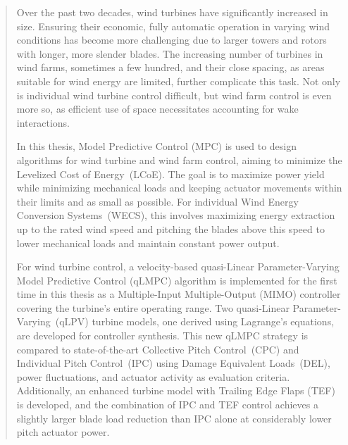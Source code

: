 \documentclass[12pt,a4paper,twoside,openright]{report}
\begin{document}
    \cleardoublepage
    \begin{abstract}
        

        
          Over the past two decades, wind turbines have significantly increased in size. Ensuring their economic, fully automatic operation in varying wind conditions has become more challenging due to larger towers and rotors with longer, more slender blades. The increasing number of turbines in wind farms, sometimes a few hundred, and their close spacing, as areas suitable for wind energy are limited, further complicate this task. Not only is individual wind turbine control difficult, but wind farm control is even more so, as efficient use of space necessitates accounting for wake interactions.
          
        In this thesis, Model Predictive Control (MPC) is used to design algorithms for wind turbine and wind farm control, aiming to minimize the Levelized Cost of Energy~(LCoE). The goal is to maximize power yield while minimizing mechanical loads and keeping actuator movements within their limits and as small as possible. For individual Wind Energy Conversion Systems~(WECS), this involves maximizing energy extraction up to the rated wind speed and pitching the blades above this speed to lower mechanical loads and maintain constant power output.
           
    For wind turbine control, a velocity-based quasi-Linear Parameter-Varying Model Predictive Control (qLMPC) algorithm is implemented for the first time in this thesis as a Multiple-Input Multiple-Output (MIMO) controller covering the turbine's entire operating range. Two quasi-Linear Parameter-Varying~(qLPV) turbine models, one derived using Lagrange's equations, are developed for controller synthesis. This new qLMPC strategy is compared to state-of-the-art Collective Pitch Control~(CPC) and Individual Pitch Control~(IPC) using Damage Equivalent Loads~(DEL), power fluctuations, and actuator activity as evaluation criteria. Additionally, an enhanced turbine model with Trailing Edge Flaps (TEF) is developed, and the combination of IPC and TEF control achieves a slightly larger blade load reduction than IPC alone at considerably lower pitch actuator power.
        
        


\end{abstract}
\end{document}
